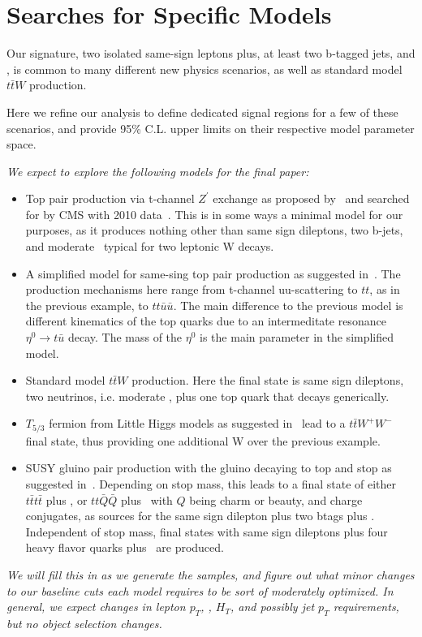 \section{Searches for Specific Models}
\label{sec:stampCollecting}

Our signature, two isolated same-sign leptons plus, at least two b-tagged jets, and \met, 
is common to many different new physics scenarios, as well as standard model $t\bar{t}W$ production.

Here we refine our analysis to define dedicated signal regions for a few of these scenarios,
and provide 95\% C.L. upper limits on their respective model parameter space.

{\it We expect to explore the following models for the final paper:}

\begin{itemize}
\item Top pair production via t-channel $Z^\prime$ exchange
as proposed by~\cite{berger} and searched for by CMS with 2010 data~\cite{sstop}. This is in some ways a minimal 
model for our purposes, as it produces nothing other than same sign dileptons, two b-jets, and moderate \met\ typical
for two leptonic W decays.
\item A simplified model for same-sing top pair production as suggested in~\cite{simplifiedModel}. 
The production mechanisms here range from t-channel uu-scattering to $tt$, as in the previous example, to
$tt\bar{u}\bar{u}$. The main difference to the previous model is different kinematics of the top quarks
due to an intermeditate resonance $\eta^0\to t \bar{u}$ decay. The mass of the $\eta^0$ is the main parameter
in the simplified model.
\item Standard model $t\bar{t}W$ production. Here the final state is same sign dileptons, two neutrinos, 
i.e. moderate \met, plus one top quark that decays generically.
\item $T_{5/3}$ fermion from Little Higgs models as suggested in~\cite{littlehiggs} lead to a $t\bar{t}W^+W^-$ final state, thus providing one additional W over the previous example.
\item SUSY gluino pair production with the gluino decaying to top and stop as suggested in~\cite{susyssbtags}\cite{susyssbtags2}. Depending on stop mass, this leads to a final state of either 
$t\bar{t}t\bar{t}$ plus \met , or $tt\bar{Q}\bar{Q}$ 
plus \met\ with $Q$ being charm or beauty, and charge conjugates, as sources for the same sign dilepton plus 
two btags plus \met. Independent of stop mass, final states with same sign dileptons plus four heavy flavor quarks
plus \met\ are produced.
\end{itemize}

{\it We will fill this in as we generate the samples, and figure out what minor changes to our baseline cuts each model
requires to be sort of moderately optimized. In general, we expect changes in lepton $p_T$, \met, $H_T$, and possibly
jet $p_T$ requirements, but no object selection changes.}


